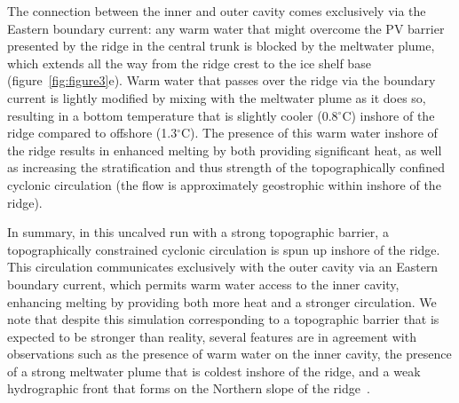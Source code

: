 \documentclass[draft]{agujournal2019}
\begin{document}
The connection between the inner and outer cavity comes exclusively via the Eastern boundary current: any warm water that might overcome the PV barrier presented by the ridge in the central trunk is blocked by the meltwater plume, which extends all the way from the ridge crest to the ice shelf base (figure~\ref{fig:figure3}e). Warm water that passes over the ridge via the boundary current is lightly modified by mixing with the meltwater plume as it does so, resulting in a bottom temperature that is slightly cooler (0.8${}^\circ$C) inshore of the ridge compared to offshore (1.3${}^\circ$C). The presence of this warm water inshore of the ridge results in enhanced melting by both providing significant heat, as well as increasing the stratification and thus strength of the topographically confined cyclonic circulation (the flow is approximately geostrophic within inshore of the ridge).

In summary, in this uncalved run with a strong topographic barrier, a topographically constrained cyclonic circulation is spun up inshore of the ridge. This circulation communicates exclusively with the outer cavity via an Eastern boundary current, which permits warm water access to the inner cavity, enhancing melting by providing both more heat and a stronger circulation. We note that despite this simulation corresponding to a topographic barrier that is expected to be stronger than reality, several features are in agreement with observations such as the presence of warm water on the inner cavity, the presence of a strong meltwater plume that is coldest inshore of the ridge, and a weak hydrographic front that forms on the Northern slope of the ridge~\cite{Jenkins2010NatureGeo}.
\end{document}

